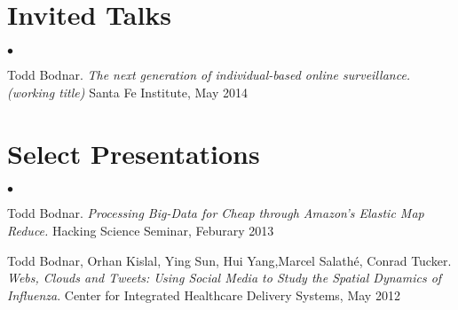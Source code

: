 \documentclass[margin,line]{res}
\newenvironment{list2}{
  \begin{list}{$\bullet$}{%
      \setlength{\itemsep}{0in}
      \setlength{\parsep}{0in} \setlength{\parskip}{0in}
      \setlength{\topsep}{0in} \setlength{\partopsep}{0in} 
      \setlength{\leftmargin}{10pt}}}{\end{list}}
\begin{document}
\begin{resume}
\section{\sc Invited Talks}
\begin{list2}
\item Todd Bodnar. \textit{The next generation of individual-based online surveillance.(working title)} Santa Fe Institute, May 2014
\end{list2}

\section{\sc Select Presentations}
\begin{list2}
\item Todd Bodnar. \textit{Processing Big-Data for Cheap through Amazon's Elastic Map Reduce.} Hacking Science Seminar, Feburary 2013
\item Todd Bodnar, Orhan Kislal, Ying Sun, Hui Yang,Marcel Salath\'e, Conrad 
Tucker. \textit{Webs, Clouds and Tweets: Using Social Media to Study the Spatial Dynamics of Influenza}. Center for Integrated Healthcare Delivery Systems, May 2012 
\end{list2}


\end{resume}
\end{document}
